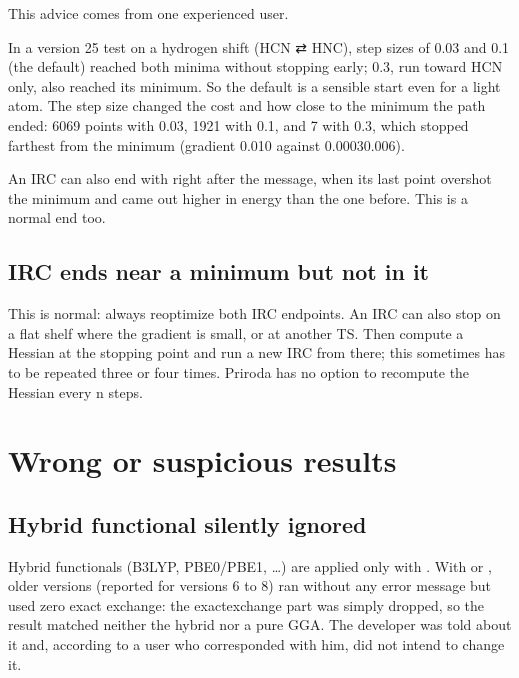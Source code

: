 \documentclass[letterpaper,10pt,english,openany,oneside]{sphinxmanual}
\begin{document}
\sphinxAtStartPar
This advice comes from one experienced user. 

\sphinxAtStartPar
In a version 25 test on a hydrogen shift (HCN ⇄ HNC), step sizes of 0.03 and 0.1 (the default) reached both minima
without stopping early; 0.3, run toward HCN only, also reached its minimum. So the default is a sensible start even
for a light atom. The step size changed the cost and how close to the minimum the path ended: 60\textendash{}69 points with
0.03, 19\textendash{}21 with 0.1, and 7 with 0.3, which stopped farthest from the minimum (gradient 0.010 against 0.0003\textendash{}0.006).



\sphinxAtStartPar
An IRC can also end with  right after the  message, when its last point
overshot the minimum and came out higher in energy than the one before. This is a normal end too. 


\subsection{IRC ends near a minimum but not in it}
\label{\detokenize{troubleshooting/common-problems:irc-ends-near-a-minimum-but-not-in-it}}
\sphinxAtStartPar
This is normal: always re\sphinxhyphen{}optimize both IRC endpoints. An IRC can also stop on a flat shelf where the gradient is
small, or at another TS. Then compute a Hessian at the stopping point and run a new IRC from there; this sometimes
has to be repeated three or four times. Priroda has no option to recompute the Hessian every n steps.




\section{Wrong or suspicious results}
\label{\detokenize{troubleshooting/common-problems:wrong-or-suspicious-results}}\label{\detokenize{troubleshooting/common-problems:troubleshooting-results}}

\subsection{Hybrid functional silently ignored}
\label{\detokenize{troubleshooting/common-problems:hybrid-functional-silently-ignored}}\label{\detokenize{troubleshooting/common-problems:troubleshooting-hybrid}}
\sphinxAtStartPar
{} Hybrid functionals (B3LYP, PBE0/PBE1, …) are applied only with {\hyperref[\detokenize{reference/control:control-theory}]{}}.
With  or , older versions (reported for versions 6 to 8) ran without any error message but used
zero exact exchange: the exact\sphinxhyphen{}exchange part was simply dropped, so the result matched neither the hybrid nor a pure
GGA. The developer was told about
it and, according to a user who corresponded with him, did not intend to change it.
\end{document}
